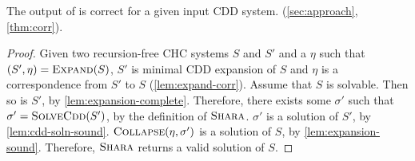 The output of \sys is correct for a given input CDD system.
(\autoref{sec:approach}, \autoref{thm:corr}).
%
\begin{proof}
  Given two recursion-free CHC systems $S$ and $S'$ and a
  $\eta$ such that $(S', \eta) = \textsc{Expand}(S)$,
  $S'$ is minimal CDD expansion of $S$ and $\eta$ is a correspondence
  from $S'$ to $S$ (\autoref{lem:expand-corr}).
  Assume that $S$ is solvable. Then so is $S'$, by
  \autoref{lem:expansion-complete}.
  Therefore, there exists some $\sigma'$ such that $\sigma' =
  \textsc{SolveCdd}(S')$, by the definition of $\textsc{Shara}$.
  $\sigma'$ is a solution of $S'$, by \autoref{lem:cdd-soln-sound}.
  $\textsc{Collapse}( \eta ,  \sigma' )$ is a solution of $S$, by
  \autoref{lem:expansion-sound}.
  Therefore, $\textsc{Shara}$ returns a valid solution of $S$.
\end{proof}
